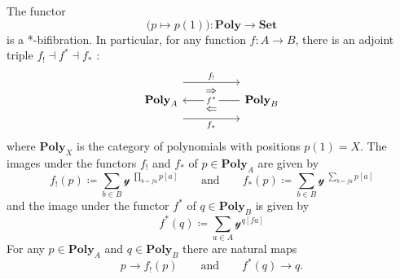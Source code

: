 \documentclass[11pt, one side, article]{memoir}
\theoremstyle{definition}
\theoremstyle{plain}
\newcommand{\Cat}[1]{\mathbf{#1}}%
\newcommand{\smset}{\Cat{Set}}
\newcommand{\yon}{\mathcal{y}}
\newcommand{\poly}{\Cat{Poly}}
\newcommand{\0}{\textsf{0}}
\newcommand{\1}{\tn{\textsf{1}}}
\newcommand{\qqand}{\qquad\text{and}\qquad}
\begin{document}
The functor
\begin{equation}\label{eqn.bifib}
\big(p\mapsto p(1)\big)\colon\poly\to\smset
\end{equation}
is a *-bifibration. In particular, for any function $f\colon A\to B$, there is an adjoint triple $f_!\dashv f^*\dashv f_*$ :
\begin{equation}
\begin{tikzcd}[column sep=50pt]
	\poly_A
		\ar[r, shift left=16pt, "f_!"]
		\ar[r, shift right=16pt, "f_*"']
		\ar[from=r, "f^*" description]
		\ar[r, phantom, shift left=8pt, "\Rightarrow"]
		\ar[r, phantom, shift right=8pt, "\Leftarrow"]
	&
	\poly_B
\end{tikzcd}
\end{equation}
where $\poly_X$ is the category of polynomials with positions $p(1)=X$. The images under the functors $f_!$ and $f_*$ of $p\in\poly_A$ are given by
\begin{equation}
	f_!(p)\coloneqq\sum_{b\in B}\yon^{\;\prod\limits_{b=fa}p[a]}
	\qqand
	f_*(p)\coloneqq\sum_{b\in B}\yon^{\;\sum\limits_{b=fa}p[a]}
\end{equation}
and the image under the functor $f^*$ of $q\in\poly_B$ is given by
\begin{equation}
	f^*(q)\coloneqq\sum_{a\in A}\yon^{q[fa]}
\end{equation}
For any $p\in\poly_A$ and $q\in\poly_B$ there are natural maps
\begin{equation}
	p\to f_!(p)
	\qqand
	f^*(q)\to q.
\end{equation}
\end{document}
